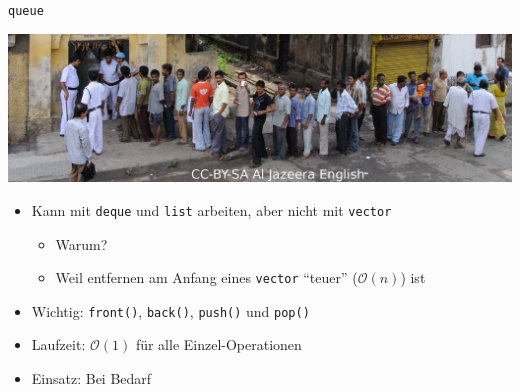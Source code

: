 \begin{frame}{\texttt{queue}}
	\begin{center}
		\includegraphics[width=0.7\linewidth]{images/queue.jpg}
	\end{center}
	
	\begin{itemize}
		\item Kann mit \texttt{deque} und \texttt{list} arbeiten, aber nicht mit \texttt{vector}
		\begin{itemize}
			\item \alert{Warum?}
			\pause
			\item Weil entfernen am Anfang eines \texttt{vector} \enquote{teuer} ($\mathcal{O}(n)$) ist
		\end{itemize}
		\item Wichtig: \texttt{front()}, \texttt{back()}, \texttt{push()} und \texttt{pop()}
		\item Laufzeit: $\mathcal{O}(1)$ für alle Einzel-Operationen
	\end{itemize}
	
	\begin{itemize}
		\item Einsatz: Bei Bedarf
	\end{itemize}
\end{frame}

